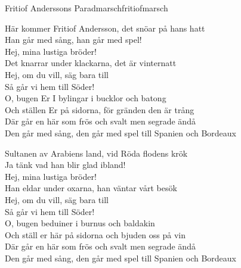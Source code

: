 \begin{song}{Fritiof Anderssons Paradmarsch}{fritiofmarsch}
\begin{vers}
Här kommer Fritiof Andersson, det snöar på hans hatt\\
Han går med sång, han går med spel!\\
Hej, mina lustiga bröder!\\
Det knarrar under klackarna, det är vinternatt\\
Hej, om du vill, säg bara till\\
Så går vi hem till Söder!\\
O, bugen Er I bylingar i bucklor och batong\\
Och ställen Er på sidorna, för gränden den är trång\\
Där går en här som frös och svalt men segrade ändå\\
Den går med sång, den går med spel till Spanien och Bordeaux\\
\end{vers}
\begin{vers}
Sultanen av Arabiens land, vid Röda flodens krök\\
Ja tänk vad han blir glad ibland!\\
Hej, mina lustiga bröder!\\
Han eldar under oxarna, han väntar vårt besök\\
Hej, om du vill, säg bara till\\
Så går vi hem till Söder!\\
O, bugen beduiner i burnus och baldakin\\
Och ställ er här på sidorna och bjuden oss på vin\\
Där går en här som frös och svalt men segrade ändå\\
Den går med sång, den går med spel till Spanien och Bordeaux\\
\end{vers}

\newp


\end{song}
